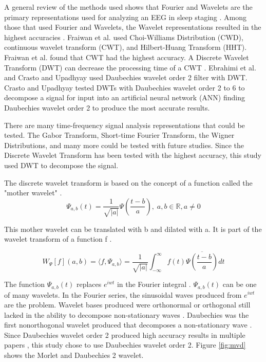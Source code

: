 \documentclass[12pt, oneside]{book}
\begin{document}
A general review of the methods used shows that Fourier and Wavelets are the primary representations used for analyzing an EEG in sleep staging \cite{alvarez_usefulness_2017}. Among those that used Fourier and Wavelets, the Wavelet representations resulted in the highest accuracies \cite{sinha_artificial_2008} \cite{ebrahimi_automatic_2008} \cite{kurt_ann-based_2009} \cite{crasto_wavelet_2017} \cite{alvarez_usefulness_2017}. Fraiwan et al. \cite{fraiwan_automated_2012} used Choi-Williams Distribution (CWD), continuous wavelet transform (CWT), and Hilbert-Huang Transform (HHT). Fraiwan et al. \cite{fraiwan_automated_2012} found that CWT had the highest accuracy. A Discrete Wavelet Transform (DWT) can decrease the processing time of a CWT \cite{debnath_wavelet_2014}. Ebrahimi et al. \cite{ebrahimi_automatic_2008} and Crasto and Upadhyay \cite{crasto_wavelet_2017} used Daubechies wavelet order 2 filter with DWT. Crasto and Upadhyay \cite{crasto_wavelet_2017} tested DWTs with Daubechies wavelet order 2 to 6 to decompose a signal for input into an artificial neural network (ANN) finding Daubechies wavelet order 2 to produce the most accurate results.

There are many time-frequency signal analysis representations that could be tested. The Gabor Transform, Short-time Fourier Transform, the Wigner Distributions, and many more could be tested with future studies. Since the Discrete Wavelet Transform has been tested with the highest accuracy, this study used DWT to decompose the signal. 

The discrete wavelet transform is based on the concept of a function called the "mother wavelet" \cite{debnath_wavelet_2014}.
\begin{equation}
\Psi_{a,b}(t) = \frac{1}{ \sqrt{|a|}} \Psi( \frac{t-b}{a}),\; a,b \in \mathbb{R}, a \neq 0
\end{equation}

This mother wavelet can be translated with b and dilated with a. It is part of the wavelet transform of a function f \cite{debnath_wavelet_2014}.

\begin{equation}
W_{\Psi}[f](a,b)=\langle f,\Psi_{a,b} \rangle = \frac{1}{ \sqrt{|a|}} \int_{-\infty}^{\infty} f(t) \overline{\Psi( \frac{t-b}{a})}dt
\end{equation}

The function \(\Psi_{a,b}(t)\) replaces \(e^{iwt} \) in the Fourier integral \cite{debnath_wavelet_2014}. \(\Psi_{a,b}(t)\) can be one of many wavelets. In the Fourier series, the sinusoidal waves produced from \(e^{iwt} \) are the problem. Wavelet bases produced were orthonormal or orthogonal still lacked in the ability to decompose non-stationary waves \cite{debnath_wavelet_2014}. Daubechies was the first nonorthogonal wavelet produced that decomposes a non-stationary wave \cite{debnath_wavelet_2014}. Since Daubechies wavelet order 2 produced high accuracy results in multiple papers \cite{crasto_wavelet_2017} \cite{ebrahimi_automatic_2008}, this study chose to use Daubechies wavelet order 2. Figure \ref{fig:mvd} shows the Morlet and Daubechies 2 wavelet.
\end{document}
